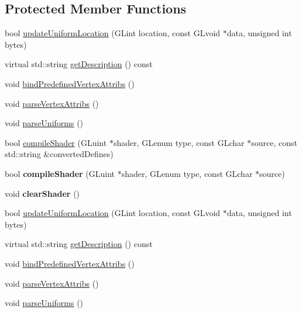 \subsection*{Protected Member Functions}
\begin{DoxyCompactItemize}
\item 
bool \hyperlink{classGLProgram_abd095be6db575a1de035b4561a322cc2}{update\+Uniform\+Location} (G\+Lint location, const G\+Lvoid $\ast$data, unsigned int bytes)
\item 
virtual std\+::string \hyperlink{classGLProgram_a9766af5ab20c17bb747ea0da2f748acc}{get\+Description} () const
\item 
void \hyperlink{classGLProgram_a04b7cb22e180a7da65e7eecd4f253b9c}{bind\+Predefined\+Vertex\+Attribs} ()
\item 
void \hyperlink{classGLProgram_a579486bb22e5676459aff2b155eb0c0b}{parse\+Vertex\+Attribs} ()
\item 
void \hyperlink{classGLProgram_a669045a0ee3604d6bab1814c2e8a34b6}{parse\+Uniforms} ()
\item 
bool \hyperlink{classGLProgram_a839b443a144c0f29044f0ccadcf96d99}{compile\+Shader} (G\+Luint $\ast$shader, G\+Lenum type, const G\+Lchar $\ast$source, const std\+::string \&converted\+Defines)
\item 
\mbox{\label{classGLProgram_a5ab59d95b0ea9c508998d0cbcac25448}} 
bool {\bfseries compile\+Shader} (G\+Luint $\ast$shader, G\+Lenum type, const G\+Lchar $\ast$source)
\item 
\mbox{\label{classGLProgram_a21dbca986f6813e0f0014802b25bc2e8}} 
void {\bfseries clear\+Shader} ()
\item 
bool \hyperlink{classGLProgram_abd095be6db575a1de035b4561a322cc2}{update\+Uniform\+Location} (G\+Lint location, const G\+Lvoid $\ast$data, unsigned int bytes)
\item 
virtual std\+::string \hyperlink{classGLProgram_a1a061f789568dede0d1bfff0c8a9dfb7}{get\+Description} () const
\item 
void \hyperlink{classGLProgram_a04b7cb22e180a7da65e7eecd4f253b9c}{bind\+Predefined\+Vertex\+Attribs} ()
\item 
void \hyperlink{classGLProgram_a579486bb22e5676459aff2b155eb0c0b}{parse\+Vertex\+Attribs} ()
\item 
void \hyperlink{classGLProgram_a669045a0ee3604d6bab1814c2e8a34b6}{parse\+Uniforms} ()
\item 

\end{DoxyCompactItemize}
